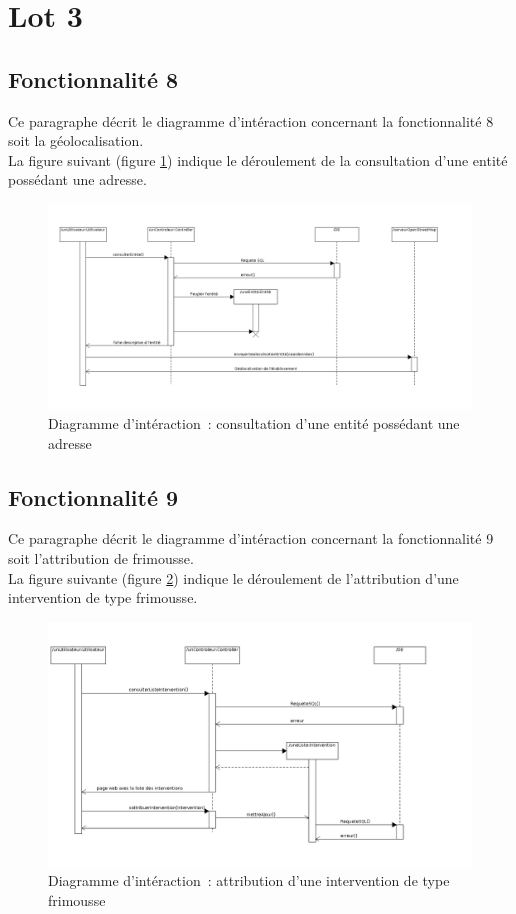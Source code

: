 \section{Lot 3}
\subsection{Fonctionnalité 8}
Ce paragraphe décrit le diagramme d'intéraction concernant la fonctionnalité 8 soit la géolocalisation. \\

La figure suivant (figure \ref{diagrammeInteraction1}) indique le déroulement de la consultation d'une entité possédant une adresse.
\begin{figure}[H]
	\centering
	\includegraphics[scale=0.39]{images/diagrammesInteraction/01_diagrammeInteractionF8.png}
	\caption{Diagramme d'intéraction~: consultation d'une entité possédant une adresse}
	\label{diagrammeInteraction1}
\end{figure}

\subsection{Fonctionnalité 9}
Ce paragraphe décrit le diagramme d'intéraction concernant la fonctionnalité 9 soit l'attribution de frimousse. \\

La figure suivante (figure \ref{diagrammeInteraction3}) indique le déroulement de l'attribution d'une intervention de type frimousse.
\begin{figure}[H]
	\centering
	\includegraphics[scale=0.45]{images/diagrammesInteraction/02_diagrammeInteractionF9.png}
	\caption{Diagramme d'intéraction~: attribution d'une intervention de type frimousse }
	\label{diagrammeInteraction3}
\end{figure}

